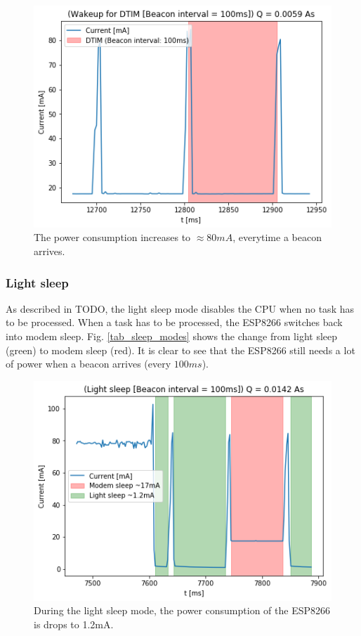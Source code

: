 \begin{figure}[h]
    \includegraphics[width = \linewidth]{fig/beacon_interval.png}
    \caption{The power consumption increases to $\approx 80mA$, everytime a beacon arrives.}
    \label{fig:beacon_interval}
\end{figure}

\subsubsection{Light sleep}
As described in TODO, the light sleep mode disables the CPU when no task has to be processed.
When a task has to be processed, the ESP8266 switches back into modem sleep.
Fig. \ref{tab_sleep_modes} shows the change from light sleep (green) to modem sleep (red).
It is clear to see that the ESP8266 still needs a lot of power when a beacon arrives (every $100ms$).

\begin{figure}[h]
    \includegraphics[width = \linewidth]{fig/light_sleep.png}
    \caption{During the light sleep mode, the power consumption of the ESP8266 is drops to 1.2mA.}
    \label{fig:light_sleep}
\end{figure}

